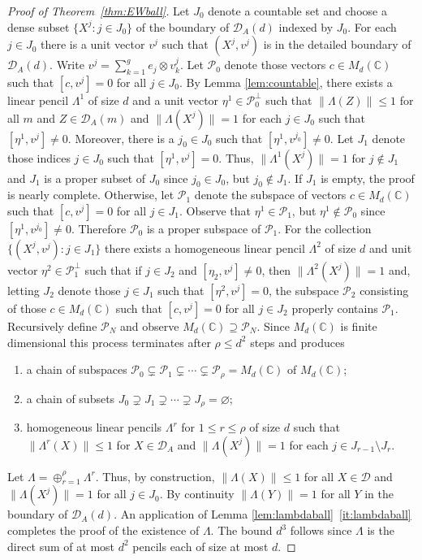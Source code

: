 \documentclass[12pt,makeidx]{amsart}
\renewcommand{\emptyset}{\varnothing}
\numberwithin{equation}{section}
\def\cD{ {{\mathcal D}}}
\def\cP{ {{\mathcal P}}}
\def\cD{ {\mathcal D} }
\def\cP{{\mathcal P}}
\def\size{d}
\def\Fdd{M_d(\mathbb C)}
\begin{document}
\begin{proof}[Proof of Theorem~\ref{thm:EWball}]
  Let $J_0$ denote a countable set and choose a dense subset $\{X^j:j\in
  J_0\}$ of the boundary of $\cD_A(d)$ indexed by $J_0$. For each
  $j\in J_0$ there is a unit vector $v^j$ such that $(X^j,v^j)$ is in
  the detailed boundary of $\cD_A(d)$. Write $v^j = \sum_{k=1}^g
  e_j\otimes v^j_k$.  Let $\mathcal P_0$ denote those vectors
  $c\in\Fdd$ such that $[ c,v^j] =0$ for all $j\in J_0$.  By Lemma
  \ref{lem:countable}, there exists a linear pencil $\Lambda^1$ of
  size $\size$ and a unit vector $\eta^1\in \mathcal P_0^\perp$ such
  that $\|\Lambda(Z)\|\le 1$ for all $m$ and $Z\in\cD_A(m)$ and
  $\|\Lambda(X^j)\|=1$ for each $j\in J_0$ such that $[ \eta^1,v^j]
  \ne 0$. Moreover, there is a $j_0\in J_0$ such that $[
  \eta^1,v^{j_0}] \ne 0$.  Let $J_1$ denote those indices $j\in J_0$
  such that $[ \eta^1,v^j] =0$. Thus, $\|\Lambda^1(X^j)\|=1$ for
  $j\notin J_1$ and $J_1$ is a proper subset of $J_0$ since $j_0\in
  J_0$, but $j_0\notin J_1$. If $J_1$ is empty, the proof is nearly
  complete. Otherwise, let $\mathcal P_1$ denote the subspace of
  vectors $c\in \Fdd$ such that $[ c,v^j] =0$ for all $j\in
  J_1$. Observe that $\eta^1 \in \cP_1$, but $\eta^1\notin \cP_0$
  since $[ \eta^1, v^{j_0}] \ne 0.$ Therefore $\cP_0$ is a proper
  subspace of $\cP_1$. For the collection $\{(X^j,v^j): j\in J_1\}$
  there exists a homogeneous linear pencil $\Lambda^2$ of size $\size$
  and unit vector $\eta^2 \in \mathcal P_1^\perp$ such that if $j\in
  J_2$ and $[ \eta_2,v^j] \ne 0$, then $\|\Lambda^2(X^j)\|=1$ and,
  letting $J_2$ denote those $j\in J_1$ such that $[ \eta^2,v^j] =0$,
  the subspace $\cP_2$ consisting of those $c\in \Fdd$ such that $[
  c,v^j] =0$ for all $j\in J_2$ properly contains $\cP_1$.
  Recursively define $\cP_N$ and observe $\Fdd \supseteq \cP_N$. Since
  $\Fdd$ is finite dimensional this process terminates after $\rho\le
  d^2$ steps and produces
\begin{enumerate}[label={\rm(\roman*)}]
 \item a chain of subspaces $\cP_0\subsetneq \cP_1 \subsetneq \cdots \subsetneq \cP_\rho =\Fdd$ of $\Fdd$;
 \item a chain of subsets $J_0\supsetneq J_1\supsetneq \cdots \supsetneq J_\rho =\emptyset$; 
 \item  homogeneous linear pencils $\Lambda^r$ for $1\le r\le \rho$ of size $\size$ such that 
      $\|\Lambda^r(X)\|\le 1$ for $X\in\cD_A$ and $\|\Lambda(X^j)\|=1$ for each $j\in J_{r-1}\setminus J_r.$
\end{enumerate}
Let $\Lambda =\oplus_{r=1}^\rho \Lambda^r$.  Thus, by construction,
$\|\Lambda(X)\|\le 1$ for all $X\in \cD$ and $\|\Lambda(X^j)\|=1$ for
all $j\in J_0$. By continuity $\|\Lambda(Y)\|=1$ for all $Y$ in the
boundary of $\cD_A(d)$.  An application of Lemma \ref{lem:lambdaball}~\ref{it:lambdaball} completes the proof of the existence of
$\Lambda$. The bound $d^3$ follows since $\Lambda$ is the direct sum
of at most $d^2$ pencils each of size at most $\size$.
\end{proof}
\end{document}
